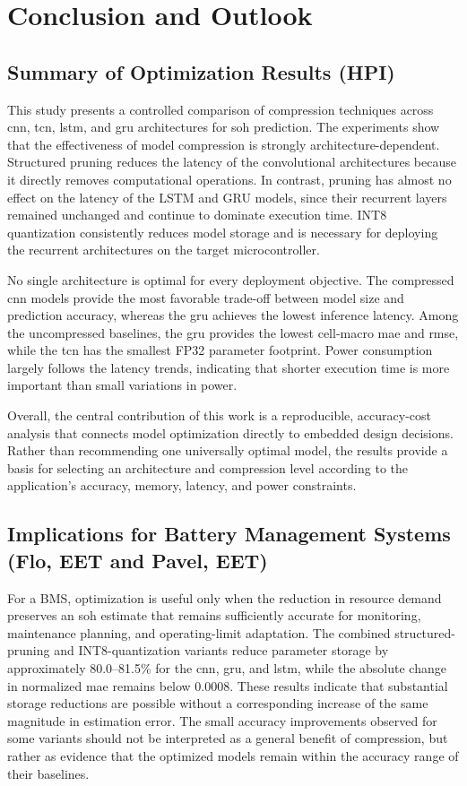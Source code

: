 \documentclass[final,3p,times]{elsarticle}
\begin{document}
\section{Conclusion and Outlook}

\subsection{Summary of Optimization Results (HPI)}

This study presents a controlled comparison of compression techniques across \ac{cnn}, \ac{tcn}, \ac{lstm}, and \ac{gru} architectures for \ac{soh} prediction. The experiments show that the effectiveness of model compression is strongly architecture-dependent. Structured pruning reduces the latency of the convolutional architectures because it directly removes computational
operations. In contrast, pruning has almost no effect on the latency of the
LSTM and GRU models, since their recurrent layers remained unchanged and
continue to dominate execution time. INT8 quantization consistently reduces
model storage and is necessary for deploying the recurrent architectures on
the target microcontroller.

No single architecture is optimal for every deployment objective. The
compressed \ac{cnn} models provide the most favorable trade-off between model size
and prediction accuracy, whereas the \ac{gru} achieves the lowest inference
latency. Among the uncompressed baselines, the \ac{gru} provides the lowest cell-macro \ac{mae} and \ac{rmse}, while the \ac{tcn} has the smallest FP32 parameter footprint. Power consumption largely
follows the latency trends, indicating that shorter execution time is more
important than small variations in power.

Overall, the central contribution of this work is a reproducible, accuracy-cost analysis that connects model optimization directly to embedded design decisions. Rather than recommending one universally optimal model, the results provide a basis for selecting an architecture and
compression level according to the application's accuracy, memory, latency,
and power constraints.

\subsection{Implications for Battery Management Systems (Flo, EET and Pavel, EET)}
For a BMS, optimization is useful only when the reduction in resource demand preserves an \ac{soh} estimate that remains sufficiently accurate for monitoring, maintenance planning, and operating-limit adaptation. The combined structured-pruning and INT8-quantization variants reduce parameter storage by approximately 80.0--81.5\% for the \ac{cnn}, \ac{gru}, and \ac{lstm}, while the absolute change in normalized \ac{mae} remains below 0.0008. These results indicate that substantial storage reductions are possible without a corresponding increase of the same magnitude in estimation error. The small accuracy improvements observed for some variants should not be interpreted as a general benefit of compression, but rather as evidence that the optimized models remain within the accuracy range of their baselines.
\end{document}
